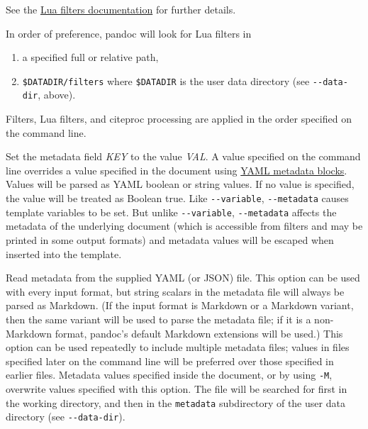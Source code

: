 \documentclass[
]{article}
\begin{document}
\begin{description}
See the \href{https://pandoc.org/lua-filters.html}{Lua filters
documentation} for further details.

In order of preference, pandoc will look for Lua filters in

\begin{enumerate}
\def\labelenumi{\arabic{enumi}.}
\item
  a specified full or relative path,
\item
  \texttt{\$DATADIR/filters} where \texttt{\$DATADIR} is the user data
  directory (see \texttt{-\/-data-dir}, above).
\end{enumerate}

Filters, Lua filters, and citeproc processing are applied in the order
specified on the command line.
\item[\texttt{-M} \emph{KEY}{[}\texttt{=}\emph{VAL}{]},
\texttt{-\/-metadata=}\emph{KEY}{[}\texttt{:}\emph{VAL}{]}]
Set the metadata field \emph{KEY} to the value \emph{VAL}. A value
specified on the command line overrides a value specified in the
document using \protect\hyperlink{extension-yaml_metadata_block}{YAML
metadata blocks}. Values will be parsed as YAML boolean or string
values. If no value is specified, the value will be treated as Boolean
true. Like \texttt{-\/-variable}, \texttt{-\/-metadata} causes template
variables to be set. But unlike \texttt{-\/-variable},
\texttt{-\/-metadata} affects the metadata of the underlying document
(which is accessible from filters and may be printed in some output
formats) and metadata values will be escaped when inserted into the
template.
\item[\texttt{-\/-metadata-file=}\emph{FILE}]
Read metadata from the supplied YAML (or JSON) file. This option can be
used with every input format, but string scalars in the metadata file
will always be parsed as Markdown. (If the input format is Markdown or a
Markdown variant, then the same variant will be used to parse the
metadata file; if it is a non-Markdown format, pandoc's default Markdown
extensions will be used.) This option can be used repeatedly to include
multiple metadata files; values in files specified later on the command
line will be preferred over those specified in earlier files. Metadata
values specified inside the document, or by using \texttt{-M}, overwrite
values specified with this option. The file will be searched for first
in the working directory, and then in the \texttt{metadata} subdirectory
of the user data directory (see \texttt{-\/-data-dir}).
\item[\texttt{-p}, \texttt{-\/-preserve-tabs{[}=true\textbar{}false{]}}]

\end{description}
\end{document}
